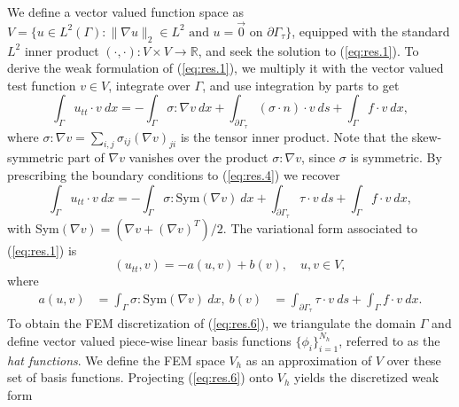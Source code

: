 We define a vector valued function space as $V = \{ u \in L^2(\Gamma) : \| \nabla u \|_2 \in L^2 \text{ and } u = \vec 0 \text{ on } \partial \Gamma_\tau \}$, equipped with the standard $L^2$ inner product $(\cdot,\cdot):V\times V \to \mathbb R$, and seek the solution to (\ref{eq:res.1}). To derive the weak formulation of (\ref{eq:res.1}), we multiply it with the vector valued test function $v \in V$, integrate over $\Gamma$, and use integration by parts to get 
\begin{equation}  \label{eq:res.4}
	\int_{\Gamma} u_{tt} \cdot v\ dx = - \int_{\Gamma} \sigma : \nabla v \ dx+ \int_{\partial \Gamma_\tau} (\sigma \cdot n) \cdot v\ ds +  \int_{\Gamma} f \cdot v \ dx,
\end{equation}
where $\sigma : \nabla v = \sum_{i,j}\sigma_{ij}(\nabla v)_{ji}$ is the tensor inner product. Note that the skew-symmetric part of $\nabla v$ vanishes over the product $\sigma : \nabla v$, since $\sigma$ is symmetric. By prescribing the boundary conditions to (\ref{eq:res.4}) we recover
\begin{equation} \label{eq:res.5}
	\int_{\Gamma} u_{tt} \cdot v\ dx = - \int_{\Gamma} \sigma : \text{Sym}(\nabla v) \ dx+ \int_{\partial \Gamma_\tau} \tau \cdot v\ ds +  \int_{\Gamma} f \cdot v \ dx,
\end{equation}
with Sym$(\nabla v) = (\nabla v + (\nabla v)^T)/2$. The variational form associated to (\ref{eq:res.1}) is
\begin{equation} \label{eq:res.6}
	(u_{tt},v) = - a(u,v) + b(v), \quad u,v\in V,
\end{equation}
where
\begin{equation} \label{eq:res.7}
\begin{aligned}
	a(u,v) &= \int_{\Gamma} \sigma : \text{Sym}(\nabla v) \ dx, ~
	b(v) &= \int_{\partial \Gamma_\tau} \tau \cdot v\ ds +  \int_{\Gamma} f \cdot v \ dx.
\end{aligned}
\end{equation}
To obtain the FEM discretization of (\ref{eq:res.6}), we triangulate the domain $\Gamma$ and define vector valued piece-wise linear basis functions $\{\phi_i\}_{i=1}^{N_h}$, referred to as the \emph{hat functions}. We define the FEM space $V_h$ as an approximation of $V$ over these set of basis functions. Projecting (\ref{eq:res.6}) onto $V_h$ yields the discretized weak form
